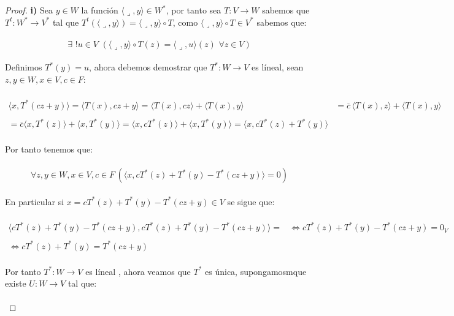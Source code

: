 \documentclass[11pt,letterpaper]{article}
\begin{document}
\begin{proof}
   \textbf{i)}\,\,Sea $y\in W$ la funci\'on $\langle \lrcorner ,y\rangle\in W^*$, por tanto sea $T:V\rightarrow W$ sabemos que $T^t:W^*\rightarrow V^*$ tal que
    $T^t(\langle \lrcorner ,y\rangle)=\langle \lrcorner ,y\rangle\circ T$, como $\langle \lrcorner ,y\rangle\circ T\in V^*$ sabemos que:\,\\
    \,\\
    \begin{equation*}
        \exists\,\,!u\in V\,\,(\langle \lrcorner ,y\rangle\circ T(z)=\langle \lrcorner ,u\rangle(z)\,\,\forall z\in V)
    \end{equation*}\,\\
    Definimos $T^*(y)=u$, ahora debemos demostrar que $T^*:W\rightarrow V$ es l\'ineal, sean $z,y\in W,x\in V,c\in F$:\,\\
    \,\\
    \begin{align*}
        \langle x,T^*(cz+y)\rangle=\langle T(x),cz+y \rangle=\langle T(x),cz \rangle+\langle T(x),y \rangle&=\overline{c}\,\langle T(x),z \rangle+\langle T(x),y \rangle\,\\
        \,\\
        =\overline{c} \langle x,T^*(z)\rangle+\langle x,T^*(y)\rangle=\langle x,cT^*(z)\rangle+\langle x,T^*(y)\rangle=\langle x,cT^*(z)+T^*(y)\rangle
\end{align*}\,\\
Por tanto tenemos que:\,\\
\,\\
\begin{equation*}
    \forall z,y\in W,x\in V,c\in F\,(\langle x,cT^*(z)+T^*(y)-T^*(cz+y)\rangle=0)
\end{equation*}\,\\
En particular si $x=cT^*(z)+T^*(y)-T^*(cz+y)\in V$ se sigue que:\,\\
\,\\
\begin{align*}
   \langle cT^*(z)+T^*(y)-T^*(cz+y),cT^*(z)+T^*(y)-T^*(cz+y)\rangle=&\iff cT^*(z)+T^*(y)-T^*(cz+y)=0_V\,\\
   \,\\ \iff cT^*(z)+T^*(y)=T^*(cz+y)
\end{align*}\,\\
Por tanto $T^{*}:W\rightarrow V$ es l\'ineal , ahora veamos que $T^{*}$ es \'unica, supongamosmque existe $U:W\rightarrow V$ tal que:\,\\
\,\\

\end{proof}
\end{document}
